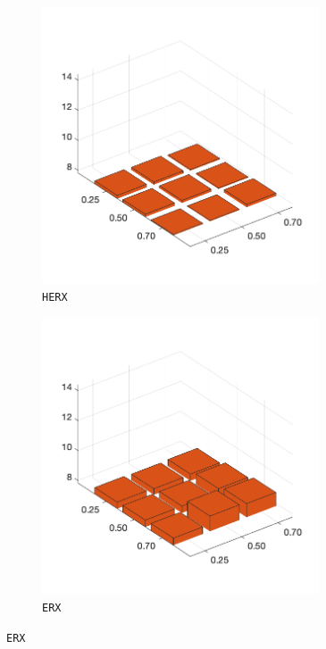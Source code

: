\begin{figure}[H]
\begin{subfigure}[b]{0.25\textwidth}
		\includegraphics[width=0.9\textwidth]{crossover/min/cross_edge_heuristic_2.png}
		\caption{\texttt{HERX}}
		\label{fig:y}
    	\end{subfigure}
%
	\begin{subfigure}[b]{0.25\textwidth}
		\centering
		\includegraphics[width=0.9\textwidth]{crossover/min/cross_edge_recombination_2.png}
		\caption{\texttt{ERX}}
		\label{fig:z}

\end{subfigure}
\end{figure}
